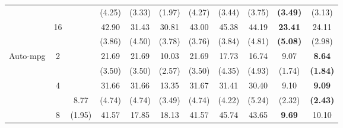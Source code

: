 \documentclass[letterpaper]{article} %
\begin{document}
\begin{table}[!t]
{\begin{tabular}{clcccccccc|cc}
\multicolumn{2}{c}{}                             &                       &                             & (4.25)                    & (3.33)                    & (1.97)                      & (4.27)                    & (3.44)                    & (3.75)                      & \textbf{(3.49)}     & (3.13)                \\
\multicolumn{2}{c}{}                             & \multirow{2}{*}{16}   &                             & 42.90                     & 31.43                     & 30.81                       & 43.00                     & 45.38                     & 44.19                       & \textbf{23.41}      & 24.11                 \\
\multicolumn{2}{c}{}                             &                       &                             & (3.86)                    & (4.50)                    & (3.78)                      & (3.76)                    & (3.84)                    & (4.81)                      & \textbf{(5.08)}     & (2.98)                \\ \hline
\multicolumn{2}{c}{\multirow{8}{*}{Auto-mpg}}    & \multirow{2}{*}{2}    &                             & 21.69                     & 21.69                     & 10.03                       & 21.69                     & 17.73                     & 16.74                       & 9.07                & \textbf{8.64}         \\
\multicolumn{2}{c}{}                             &                       &                             & (3.50)                    & (3.50)                    & (2.57)                      & (3.50)                    & (4.35)                    & (4.93)                      & (1.74)              & \textbf{(1.84)}       \\
\multicolumn{2}{c}{}                             & \multirow{2}{*}{4}    &                             & 31.66                     & 31.66                     & 13.35                       & 31.67                     & 31.41                     & 30.40                       & 9.10                & \textbf{9.09}         \\
\multicolumn{2}{c}{}                             &                       & 8.77                        & (4.74)                    & (4.74)                    & (3.49)                      & (4.74)                    & (4.22)                    & (5.24)                      & (2.32)              & \textbf{(2.43)}       \\
\multicolumn{2}{c}{}                             & \multirow{2}{*}{8}    & (1.95)                      & 41.57                     & 17.85                     & 18.13                       & 41.57                     & 45.74                     & 43.65                       & \textbf{9.69}       & 10.10                 \\

\end{tabular}}
\end{table}
\end{document}
